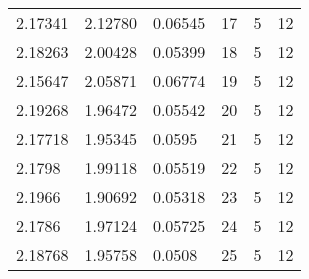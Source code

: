 \begin{table}[H]
\begin{tabular}{lll|lll}
2.17341                        & 2.12780                        & 0.06545                       & 17      & 5         & 12      \\
2.18263                        & 2.00428                        & 0.05399                       & 18      & 5         & 12      \\
{\color[HTML]{FE0000} 2.15647} & 2.05871                        & 0.06774                       & 19      & 5         & 12      \\
2.19268                        & 1.96472                        & 0.05542                       & 20      & 5         & 12      \\
2.17718                        & 1.95345                        & 0.0595                        & 21      & 5         & 12      \\
2.1798                         & 1.99118                        & 0.05519                       & 22      & 5         & 12      \\
2.1966                         & {\color[HTML]{FE0000} 1.90692} & 0.05318                       & 23      & 5         & 12      \\
2.1786                         & 1.97124                        & 0.05725                       & 24      & 5         & 12      \\
2.18768                        & 1.95758                        & {\color[HTML]{FE0000} 0.0508} & 25      & 5         & 12      \\
\end{tabular}
\end{table}

\vspace{0.5cm}



